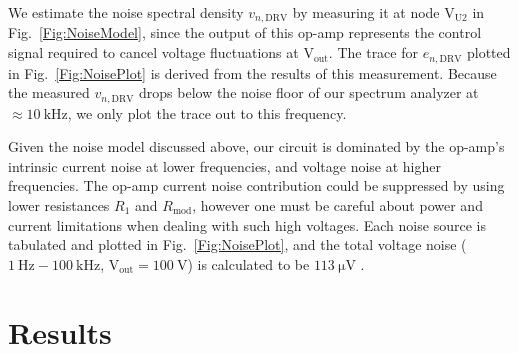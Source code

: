 \documentclass[aip,rsi,reprint]{revtex4-1} %
\begin{document}
We estimate the noise spectral density $v_{n,\text{DRV}}$ by measuring it at node $\text{V}_\text{U2}$ in Fig.~\ref{Fig:NoiseModel}, since the output of this op-amp represents the control signal required to cancel voltage fluctuations at $\text{V}_\text{out}$.
The trace for $e_{n,\text{DRV}}$ plotted in Fig.~\ref{Fig:NoisePlot} is derived from the results of this measurement.
Because the measured $v_{n,\text{DRV}}$ drops below the noise floor of our spectrum analyzer at $\approx \SI{10}{\kilo\hertz}$, we only plot the trace out to this frequency.


Given the noise model discussed above, our circuit is dominated by the op-amp's intrinsic current noise at lower frequencies, and voltage noise at higher frequencies.
The op-amp current noise contribution could be suppressed by using lower resistances $R_1$ and $R_\text{mod}$, however one must be careful about power and current limitations when dealing with such high voltages.
Each noise source is tabulated and plotted in Fig.~\ref{Fig:NoisePlot}, and the total voltage noise ($\SI{1}{\hertz} - \SI{100}{\kilo\hertz}$, $\text{V}_\text{out} = \SI{100}{\volt}$) is calculated to be $\SI{113}{\micro\volt}$ .

\section{Results}
\label{Sec:Results}
\end{document}
